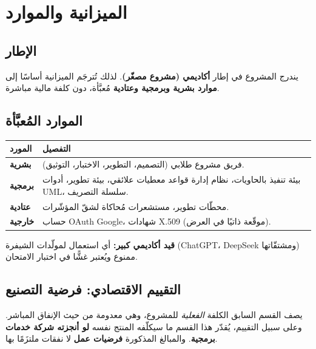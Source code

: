 \chapter{الميزانية والموارد}

\section{الإطار}
يندرج المشروع في إطار \textbf{أكاديمي (مشروع مصغّر)}. لذلك تُترجَم الميزانية
أساسًا إلى \textbf{موارد بشرية وبرمجية وعتادية} مُعبَّأة، دون كلفة مالية مباشرة.

\section{الموارد المُعبَّأة}
\begin{xltabular}{\textwidth}{>{\bfseries}p{4cm} X}
\toprule
\textbf{المورد} & \textbf{التفصيل} \\
\midrule
\endhead
بشرية & فريق مشروع طلابي (التصميم، التطوير، الاختبار، التوثيق). \\
برمجية & بيئة تنفيذ بالحاويات، نظام إدارة قواعد معطيات علائقي، بيئة تطوير، أدوات UML، سلسلة التصريف. \\
عتادية & محطّات تطوير، مستشعرات مُحاكاة لشقّ المؤشّرات. \\
خارجية & حساب OAuth Google، شهادات X.509 (موقّعة ذاتيًا في العرض). \\
\bottomrule
\end{xltabular}

\begin{encadre}
\textbf{قيد أكاديمي كبير:} أي استعمال لمولّدات الشيفرة (ChatGPT، DeepSeek
ومشتقّاتها) ممنوع ويُعتبر غشًّا في اختبار الامتحان.
\end{encadre}

\section{التقييم الاقتصادي: فرضية التصنيع}
يصف القسم السابق الكلفة \emph{الفعلية} للمشروع، وهي معدومة من حيث الإنفاق
المباشر. وعلى سبيل التقييم، يُقدّر هذا القسم ما سيكلّفه المنتج نفسه \textbf{لو
أنجزته شركة خدمات برمجية}. والمبالغ المذكورة \textbf{فرضيات عمل} لا نفقات
ملتزَمًا بها.

